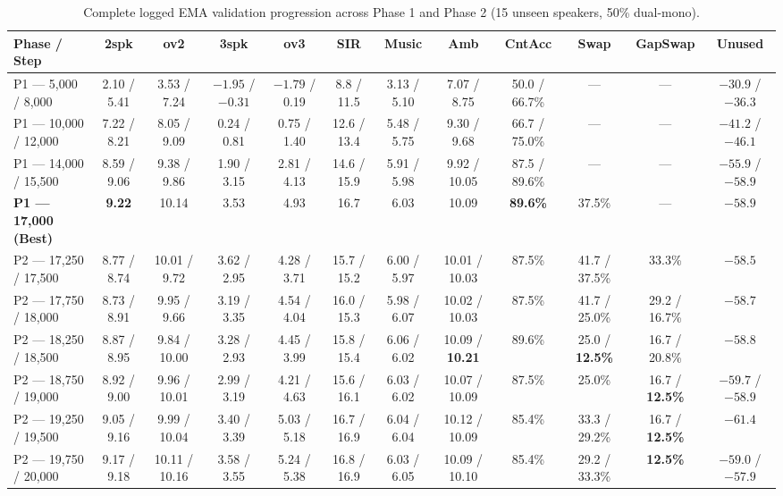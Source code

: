 \documentclass[10pt,a4paper]{article}
\begin{document}
\begin{table}[h]
\centering
\caption{Complete logged EMA validation progression across Phase 1 and Phase 2 (15 unseen speakers, 50\% dual-mono).}
\label{tab:main_results}
\footnotesize
\begin{tabular}{lccccccccccc}
\toprule
\textbf{Phase / Step} & \textbf{2spk} & \textbf{ov2} & \textbf{3spk} & \textbf{ov3} & \textbf{SIR} & \textbf{Music} & \textbf{Amb} & \textbf{CntAcc} & \textbf{Swap} & \textbf{GapSwap} & \textbf{Unused} \\
\midrule
P1 --- 5,000 / 8,000 & 2.10 / 5.41 & 3.53 / 7.24 & $-1.95$ / $-0.31$ & $-1.79$ / 0.19 & 8.8 / 11.5 & 3.13 / 5.10 & 7.07 / 8.75 & 50.0 / 66.7\% & --- & --- & $-30.9$ / $-36.3$ \\
P1 --- 10,000 / 12,000 & 7.22 / 8.21 & 8.05 / 9.09 & 0.24 / 0.81 & 0.75 / 1.40 & 12.6 / 13.4 & 5.48 / 5.75 & 9.30 / 9.68 & 66.7 / 75.0\% & --- & --- & $-41.2$ / $-46.1$ \\
P1 --- 14,000 / 15,500 & 8.59 / 9.06 & 9.38 / 9.86 & 1.90 / 3.15 & 2.81 / 4.13 & 14.6 / 15.9 & 5.91 / 5.98 & 9.92 / 10.05 & 87.5 / 89.6\% & --- & --- & $-55.9$ / $-58.9$ \\
\textbf{P1 --- 17,000 (Best)} & \textbf{9.22} & 10.14 & 3.53 & 4.93 & 16.7 & 6.03 & 10.09 & \textbf{89.6\%} & 37.5\% & --- & $-58.9$ \\
\midrule
P2 --- 17,250 / 17,500 & 8.77 / 8.74 & 10.01 / 9.72 & 3.62 / 2.95 & 4.28 / 3.71 & 15.7 / 15.2 & 6.00 / 5.97 & 10.01 / 10.03 & 87.5\% & 41.7 / 37.5\% & 33.3\% & $-58.5$ \\
P2 --- 17,750 / 18,000 & 8.73 / 8.91 & 9.95 / 9.66 & 3.19 / 3.35 & 4.54 / 4.04 & 16.0 / 15.3 & 5.98 / 6.07 & 10.02 / 10.03 & 87.5\% & 41.7 / 25.0\% & 29.2 / 16.7\% & $-58.7$ \\
P2 --- 18,250 / 18,500 & 8.87 / 8.95 & 9.84 / 10.00 & 3.28 / 2.93 & 4.45 / 3.99 & 15.8 / 15.4 & 6.06 / 6.02 & 10.09 / \textbf{10.21} & 89.6\% & 25.0 / \textbf{12.5\%} & 16.7 / 20.8\% & $-58.8$ \\
P2 --- 18,750 / 19,000 & 8.92 / 9.00 & 9.96 / 10.01 & 2.99 / 3.19 & 4.21 / 4.63 & 15.6 / 16.1 & 6.03 / 6.02 & 10.07 / 10.09 & 87.5\% & 25.0\% & 16.7 / \textbf{12.5\%} & $-59.7$ / $-58.9$ \\
P2 --- 19,250 / 19,500 & 9.05 / 9.16 & 9.99 / 10.04 & 3.40 / 3.39 & 5.03 / 5.18 & 16.7 / 16.9 & 6.04 / 6.04 & 10.12 / 10.09 & 85.4\% & 33.3 / 29.2\% & 16.7 / \textbf{12.5\%} & \textbf{$-61.4$} \\
P2 --- 19,750 / 20,000 & 9.17 / 9.18 & 10.11 / 10.16 & 3.58 / 3.55 & 5.24 / 5.38 & 16.8 / 16.9 & 6.03 / 6.05 & 10.09 / 10.10 & 85.4\% & 29.2 / 33.3\% & \textbf{12.5\%} & $-59.0$ / $-57.9$ \\

\end{tabular}
\end{table}
\end{document}
